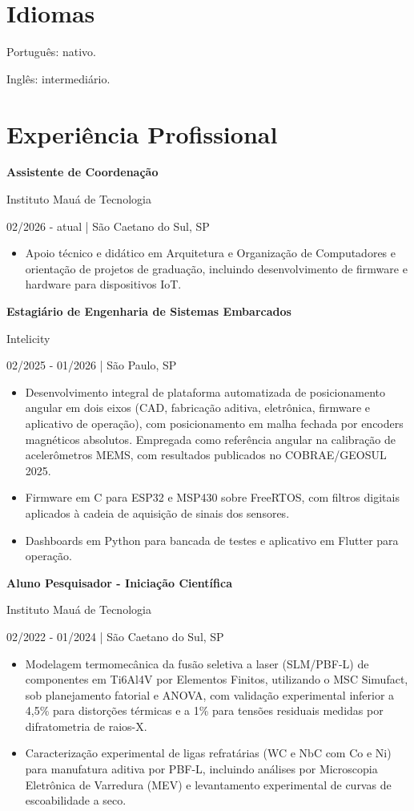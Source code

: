 \documentclass[10pt,a4paper]{article}
\newcommand{\entrada}[3]{%
  \textbf{#1}\par
  #2\par
  #3\par
  \vspace{2pt}}
\newcommand{\espaco}{\vspace{7pt}}
\begin{document}
\section{Idiomas}

Português: nativo.\par
Inglês: intermediário.\par

\section{Experiência Profissional}

\entrada{Assistente de Coordenação}
        {Instituto Mauá de Tecnologia}
        {02/2026 - atual | São Caetano do Sul, SP}
\begin{itemize}
  \item Apoio técnico e didático em Arquitetura e Organização de Computadores e
        orientação de projetos de graduação, incluindo desenvolvimento de
        firmware e hardware para dispositivos IoT.
\end{itemize}

\espaco
\entrada{Estagiário de Engenharia de Sistemas Embarcados}
        {Intelicity}
        {02/2025 - 01/2026 | São Paulo, SP}
\begin{itemize}
  \item Desenvolvimento integral de plataforma automatizada de posicionamento
        angular em dois eixos (CAD, fabricação aditiva, eletrônica, firmware e
        aplicativo de operação), com posicionamento em malha fechada por
        encoders magnéticos absolutos. Empregada como referência angular na
        calibração de acelerômetros MEMS, com resultados publicados no
        COBRAE/GEOSUL 2025.
  \item Firmware em C para ESP32 e MSP430 sobre FreeRTOS, com filtros digitais
        aplicados à cadeia de aquisição de sinais dos sensores.
  \item Dashboards em Python para bancada de testes e aplicativo em Flutter
        para operação.
\end{itemize}

\espaco
\entrada{Aluno Pesquisador - Iniciação Científica}
        {Instituto Mauá de Tecnologia}
        {02/2022 - 01/2024 | São Caetano do Sul, SP}
\begin{itemize}
  \item Modelagem termomecânica da fusão seletiva a laser (SLM/PBF-L) de
        componentes em Ti6Al4V por Elementos Finitos, utilizando o MSC
        Simufact, sob planejamento fatorial e ANOVA, com validação experimental
        inferior a 4,5\% para distorções térmicas e a 1\% para tensões
        residuais medidas por difratometria de raios-X.
  \item Caracterização experimental de ligas refratárias (WC e NbC com Co e Ni)
        para manufatura aditiva por PBF-L, incluindo análises por Microscopia
        Eletrônica de Varredura (MEV) e levantamento experimental de curvas de
        escoabilidade a seco.
\end{itemize}
\end{document}
